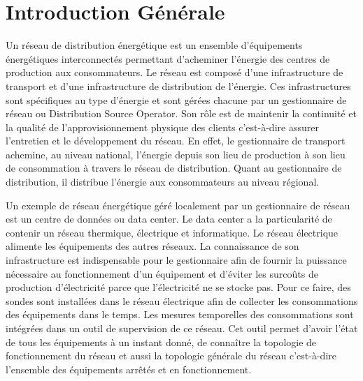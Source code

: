 \chapter{Introduction G\'en\'erale}

Un r\'eseau de distribution \'energ\'etique est un ensemble d'\'equipements \'energ\'etiques interconnect\'es permettant d'acheminer l'\'energie des centres de production aux consommateurs. 
Le r\'eseau est compos\'e d'une infrastructure de transport et d'une infrastructure de distribution de l'\'energie. Ces infrastructures sont sp\'ecifiques au type d'\'energie et sont g\'er\'ees chacune par un gestionnaire de r\'eseau ou Distribution Source Operator. Son r\^ole est de maintenir la continuit\'e et la qualit\'e de l'approvisionnement physique des clients c'est-\`a-dire assurer l'entretien et le d\'eveloppement du r\'eseau. 
En effet, le gestionnaire de transport achemine, au niveau national, l'\'energie depuis son lieu de production \`a son lieu de consommation \`a travers le r\'eseau de distribution. Quant au gestionnaire de distribution, il distribue l'\'energie aux consommateurs au niveau r\'egional.
\newline

Un exemple de r\'eseau \'energ\'etique g\'er\'e localement par un gestionnaire de r\'eseau est un centre de donn\'ees ou data center. Le data center a la particularit\'e de contenir un r\'eseau thermique, \'electrique et informatique. Le r\'eseau \'electrique alimente les \'equipements des autres r\'eseaux. La connaissance de son infrastructure est indispensable pour le gestionnaire afin
de fournir  la puissance n\'ecessaire au fonctionnement d'un \'equipement et 
 d'\'eviter les surco\^uts de production d'\'electricit\'e parce que l'\'electricit\'e ne se stocke pas.
Pour ce faire, 
des sondes sont install\'ees dans le r\'eseau \'electrique afin de collecter les consommations des \'equipements dans le temps. Les mesures temporelles des consommations sont int\'egr\'ees dans un outil de supervision de ce r\'eseau. Cet outil permet d'avoir l'\'etat de tous les \'equipements \`a un instant donn\'e, de conna\^itre la topologie de fonctionnement du r\'eseau et aussi la topologie g\'en\'erale du r\'eseau c'est-\`a-dire l'ensemble des \'equipements arr\^et\'es et en fonctionnement.
\newline

